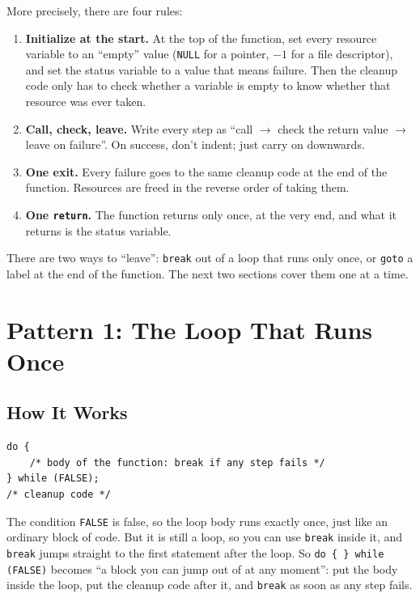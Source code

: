 More precisely, there are four rules:
\begin{enumerate}
  \item \textbf{Initialize at the start.} At the top of the function, set every resource variable to an ``empty'' value (\texttt{NULL} for a pointer, $-1$ for a file descriptor), and set the status variable to a value that means failure. Then the cleanup code only has to check whether a variable is empty to know whether that resource was ever taken.
  \item \textbf{Call, check, leave.} Write every step as ``call $\to$ check the return value $\to$ leave on failure''. On success, don't indent; just carry on downwards.
  \item \textbf{One exit.} Every failure goes to the same cleanup code at the end of the function. Resources are freed in the reverse order of taking them.
  \item \textbf{One \texttt{return}.} The function returns only once, at the very end, and what it returns is the status variable.
\end{enumerate}

There are two ways to ``leave'': \texttt{break} out of a loop that runs only once, or \texttt{goto} a label at the end of the function. The next two sections cover them one at a time.

\section{Pattern 1: The Loop That Runs Once}
\label{sec:do-while}

\subsection{How It Works}

\begin{verbatim}
do {
    /* body of the function: break if any step fails */
} while (FALSE);
/* cleanup code */
\end{verbatim}

The condition \texttt{FALSE} is false, so the loop body runs exactly once, just like an ordinary block of code. But it is still a loop, so you can use \texttt{break} inside it, and \texttt{break} jumps straight to the first statement after the loop. So \texttt{do \{ \} while (FALSE)} becomes ``a block you can jump out of at any moment'': put the body inside the loop, put the cleanup code after it, and \texttt{break} as soon as any step fails.

